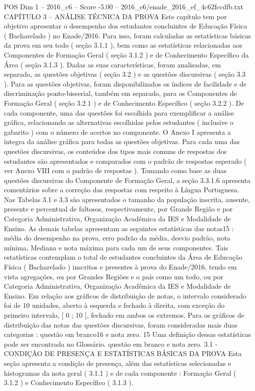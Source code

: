 \begin{textsample}{POS Dim 1 – 2016\_c6 – Score -5.00 – 2016\_c6/enade\_2016\_ef\_4c62fccdfb.txt}  \label{ex:f1_pos_399}
CAPÍTULO 3 – ANÁLISE TÉCNICA DA PROVA Este capítulo tem por objetivo apresentar o desempenho dos estudantes concluintes de Educação Física ( Bacharelado ) no Enade/2016.
Para isso, foram calculadas as estatísticas básicas da prova em seu todo ( seção 3.1.1 ), bem como as estatísticas relacionadas aos Componentes de Formação Geral ( seção 3.1.2 ) e de Conhecimento Específico da Área ( seção 3.1.3 ).
Dadas as suas características, foram analisadas, em separado, as questões objetivas ( seção 3.2 ) e as questões discursivas ( seção 3.3 ).
Para as questões objetivas, foram disponibilizados os índices de facilidade e de discriminação ponto-bisserial, também em separado, para os Componentes de Formação Geral ( seção 3.2.1 ) e de Conhecimento Específico ( seção 3.2.2 ).
De cada componente, uma das questões foi escolhida para exemplificar a análise gráfica, relacionando as alternativas escolhidas pelos estudantes ( inclusive o gabarito ) com o número de acertos no componente.
O Anexo I apresenta a íntegra da análise gráfica para todas as questões objetivas.
Para cada uma das questões discursivas, os conteúdos dos tipos mais comuns de respostas dos estudantes são apresentados e comparados com o padrão de respostas esperado ( ver Anexo VIII com o padrão de respostas ).
Tomando como base as duas questões discursivas do Componente de Formação Geral, a seção 3.3.1.6 apresenta comentários sobre a correção das respostas com respeito à Língua Portuguesa.
Nas Tabelas 3.1 e 3.3 são apresentados o tamanho da população inscrita, ausente, presente e percentual de faltosos, respectivamente, por Grande Região e por Categoria Administrativa, Organização Acadêmica da IES e Modalidade de Ensino.
As demais tabelas apresentam as seguintes estatísticas das notas15 : média do desempenho na prova, erro padrão da média, desvio padrão, nota mínima, Mediana e nota máxima para cada um de seus componentes.
Tais estatísticas contemplam o total de estudantes concluintes da Área de Educação Física ( Bacharelado ) inscritos e presentes à prova do Enade/2016, tendo em vista agregações, ou por Grandes Regiões e o país como um todo, ou por Categoria Administrativa, Organização Acadêmica da IES e Modalidade de Ensino.
Em relação aos gráficos de distribuição de notas, o intervalo considerado foi de 10 unidades, aberto à esquerda e fechado à direita, com exceção do primeiro intervalo, [ 0 ; 10 ], fechado em ambos os extremos.
Para os gráficos de distribuição das notas das questões discursivas, foram consideradas mais duas categorias : questão em branco16 e nota zero. 15 Uma definição dessas estatísticas pode ser encontrada no Glossário. questão em branco e nota zero. 3.1 - CONDIÇÃO DE PRESENÇA E ESTATÍSTICAS BÁSICAS DA PROVA Esta seção apresenta a condição de presença, além das estatísticas selecionadas e histogramas da nota geral ( 3.1.1 ) e de cada componente : Formação Geral ( 3.1.2 ) e Conhecimento Específico ( 3.1.3 ).

\end{textsample}
